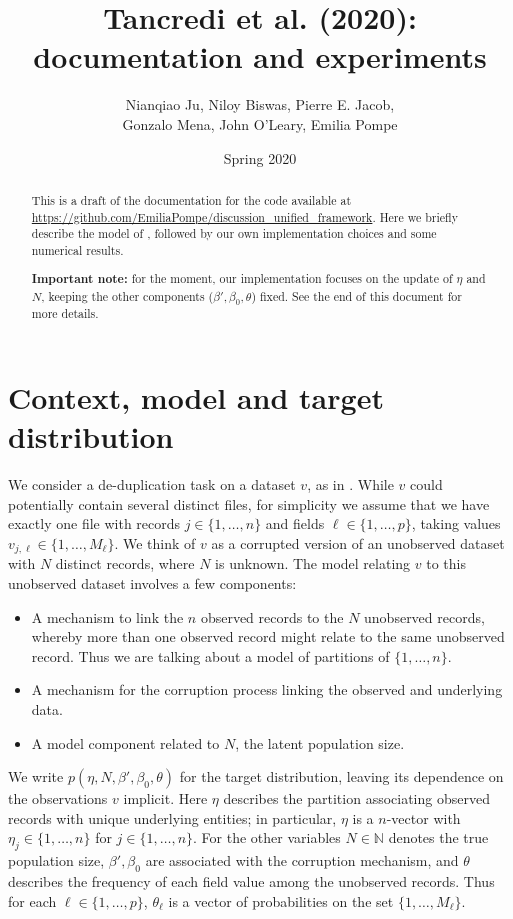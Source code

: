 \documentclass{article}
\title{Tancredi et al. (2020): documentation and experiments}
\date{Spring 2020}
\author{Nianqiao Ju, Niloy Biswas, Pierre E. Jacob,\\ Gonzalo Mena,
John O'Leary, Emilia Pompe}
\begin{document}
\maketitle

\begin{abstract}
This is a draft of the documentation for the code available at
\url{https://github.com/EmiliaPompe/discussion_unified_framework}.
Here we briefly describe the model of \citet{tancredi2018unified},
followed by our own implementation choices and some numerical results.

\textbf{Important note:} for the moment, our implementation
focuses on the update of $\eta$ and $N$, keeping
the other components ($\beta',\beta_0,\theta$) fixed. See the end of this document for more details.
\end{abstract}

\section{Context, model and target distribution}

We consider a de-duplication task on a dataset $v$, as in \citet{tancredi2018unified}. While $v$ could potentially contain several distinct files, for simplicity we assume that we have exactly one file with records $j \in \{1,\dots,n\}$ and fields $\ell \in \{1, \dots, p \}$, taking values ${v_{j,\ell} \in \{1, \dots, M_\ell\}}$.
We think of $v$ as a corrupted version of an unobserved dataset with $N$ distinct records, where $N$ is unknown.
The model relating $v$ to this unobserved dataset involves a few components:
\begin{itemize}
    \item A mechanism to link the $n$ observed records to the $N$ unobserved records, whereby more than one observed record might relate to the same unobserved record. Thus we are talking about a model of partitions of $\{1,\ldots,n\}$.
    \item A mechanism for the corruption process linking the observed and underlying data.
    \item A model component related to $N$, the latent population size.
\end{itemize}

We write $p(\eta, N, \beta', \beta_0, \theta)$ for the target distribution, leaving its dependence on the observations $v$ implicit. Here $\eta$ describes the partition associating observed records with unique underlying entities; in particular, $\eta$ is a $n$-vector with $\eta_j \in \{1,\ldots,n\}$ for $j \in \{1,\dots,n\}$.
For the other variables $N \in \mathbb{N}$ denotes the true population size, $\beta',\beta_0$ are associated with the corruption mechanism, and $\theta$ describes the frequency of each field value among the unobserved records. Thus for each $\ell \in \{1,\dots,p\}$, $\theta_\ell$ is a vector of probabilities on the set $\{1,\dots,M_\ell\}$.
\end{document}
